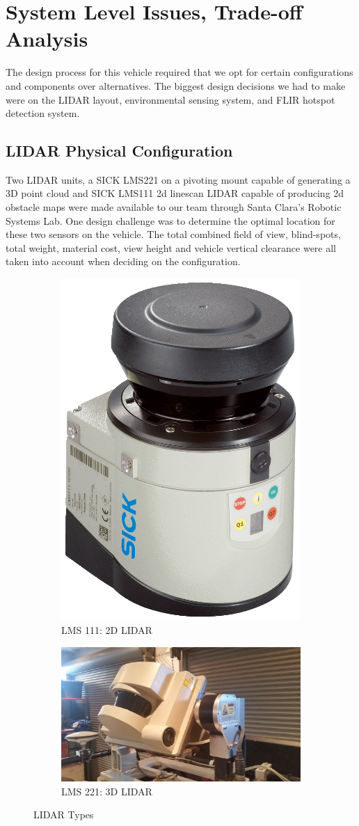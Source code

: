 \section{System Level Issues, Trade-off Analysis}
The design process for this vehicle required that we opt for certain configurations and components over alternatives. The biggest design decisions we had to make were on the LIDAR layout, environmental sensing system, and FLIR hotspot detection system.\\

\subsection{LIDAR Physical Configuration}

Two LIDAR units, a SICK LMS221 on a pivoting mount capable of generating a 3D point cloud and SICK LMS111 2d linescan LIDAR capable of producing 2d obstacle maps were made available to our team through Santa Clara's  Robotic Systems Lab. One design challenge was to determine the optimal location for these two sensors on the vehicle. The total combined field of view, blind-spots, total weight, material cost, view height and vehicle vertical clearance were all taken into account when deciding on the configuration. 

\begin{figure}[H]
\centering
\begin{subfigure}{.5\textwidth}
  \centering
  \includegraphics[height=.5\linewidth]{LMS111}
  \caption{LMS 111: 2D LIDAR}
\end{subfigure}%
\begin{subfigure}{.5\textwidth}
  \centering
  \includegraphics[height=.5\linewidth]{LMS221}
  \caption{LMS 221: 3D LIDAR}
\end{subfigure}
\caption{LIDAR Types}
\label{fig:lidartest}
\end{figure}

